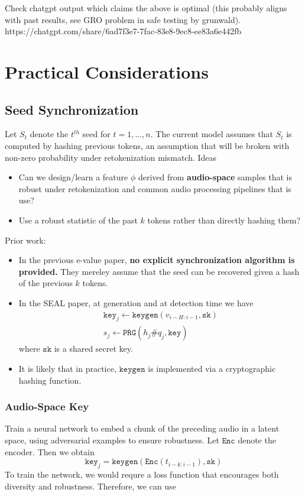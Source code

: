 \documentclass[12pt]{article}
\theoremstyle{plain}
\theoremstyle{definition}
\begin{document}
Check chatgpt output which claims the above is optimal (this probably aligns with past results, see GRO problem in safe testing by grunwald). https://chatgpt.com/share/6ad7f3e7-7fac-83e8-9ec8-ee83a6e442fb




\section{Practical Considerations}

\subsection{Seed Synchronization}
\label{sec:seed_sync}
Let $S_t$ denote the $t^{th}$ seed for $t=1,...,n$. The current model assumes that $S_t$ is computed by hashing previous tokens, an assumption that will be broken with non-zero probability under retokenization mismatch. Ideas
\begin{itemize}
    \item Can we design/learn a feature $\phi$ derived from \textbf{audio-space} samples that is robust under retokenization and common audio processing pipelines that is use?
    \item Use a robust statistic of the past $k$ tokens rather than directly hashing them?
\end{itemize}
Prior work:
\begin{itemize}
    \item In the previous e-value paper, \textbf{no explicit synchronization algorithm is provided.} They mereley assume that the seed can be recovered given a hash of the previous $k$ tokens.
    \item In the SEAL paper, at generation and at detection time we have
    \begin{align}
        \texttt{key}_j\leftarrow\texttt{keygen}(v_{i-H:i-1}, \texttt{sk})\\
        s_j \leftarrow \texttt{PRG}(h_j\#q_j,\texttt{key})
    \end{align}
    where $\texttt{sk}$ is a shared secret key.
    \item It is likely that in practice, $\texttt{keygen}$ is implemented via a cryptographic hashing function.
\end{itemize}

\subsubsection{Audio-Space Key}
Train a neural network to embed a chunk of the preceding audio in a latent space, using adversarial examples to ensure robustness. Let $\texttt{Enc}$ denote the encoder. Then we obtain
\begin{equation}
    \texttt{key}_j=\texttt{keygen}(\texttt{Enc}(t_{i-k:i-1}), \texttt{sk})
\end{equation}
To train the network, we would requre a loss function that encourages both diversity and robustness. Therefore, we can use
\end{document}

